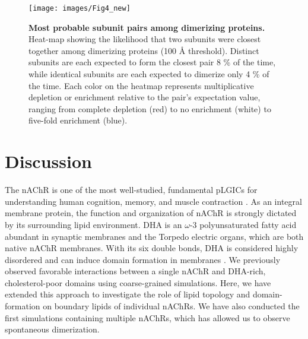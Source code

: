\begin{figure}[htp]
	\center
	\texttt{[image: images/Fig4\_new]}
\caption[Subunit pairs among dimerizing proteins]{{\bf Most probable subunit pairs among dimerizing proteins.} Heat-map showing the likelihood that two subunits were closest together among dimerizing proteins (100 {\AA} threshold). Distinct subunits are each expected to form the closest pair 8 \% of the time, while identical subunits are each expected to dimerize only 4 \% of the time. Each color on the heatmap represents multiplicative depletion or enrichment relative to the pair's expectation value, ranging from complete depletion (red) to no enrichment (white) to five-fold enrichment (blue).  }
\label{fig:Figure7}
\end{figure}

\section{Discussion} 


The nAChR is one of the most well-studied, fundamental pLGICs for understanding human cognition, memory, and muscle contraction \citep{Gotti1997}. As an integral membrane protein, the function and organization of nAChR is strongly dictated by its surrounding lipid environment. DHA is an $\omega$-3 polyunsaturated fatty acid abundant in synaptic membranes and the Torpedo electric organs, which are both native nAChR membranes. With its six double bonds, DHA is considered highly disordered and can induce domain formation in membranes \citep{S000930840800032720080101}. We previously observed \citep{Sharp2019} favorable interactions between a single nAChR and DHA-rich, cholesterol-poor domains using coarse-grained simulations. Here, we have extended this approach to investigate the role of lipid topology and domain-formation on boundary lipids of individual nAChRs. We have also conducted the first simulations containing multiple nAChRs, which has allowed us to observe spontaneous dimerization.  

